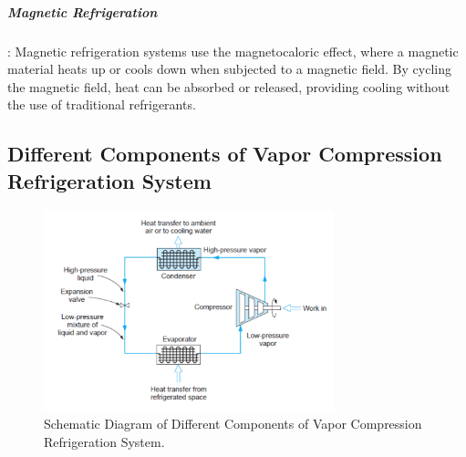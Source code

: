 \documentclass{article}
\begin{document}
\subparagraph{Magnetic Refrigeration}: Magnetic refrigeration systems use the magnetocaloric effect, where a magnetic material heats up or cools down when subjected to a magnetic field. By cycling the magnetic field, heat can be absorbed or released, providing cooling without the use of traditional refrigerants.
\vspace{0.5cm}
\subsection{Different Components of Vapor 
Compression Refrigeration System}
\begin{figure}[H]
  \centering
  \includegraphics[width=0.75\textwidth]{img/cycle.png}
  \caption{Schematic Diagram of Different Components of Vapor 
  Compression Refrigeration System.}
  \label{fig:components}
\end{figure}
\vspace{0.25cm}
\end{document}
